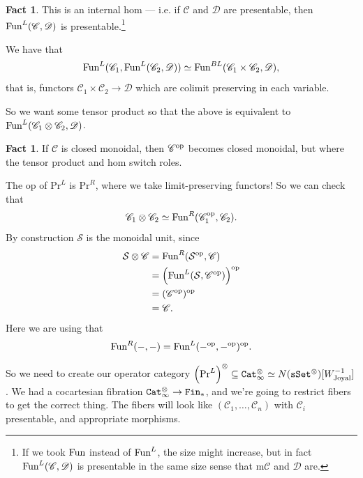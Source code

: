 \documentclass[12pt]{amsart}
\theoremstyle{definition}
\newtheorem{fact}[theorem]{Fact}
\providecommand{\Pr}{\text{Pr}}
\begin{document}
\begin{fact} This is an internal hom --- i.e. if $\mathscr{C}$ and $\mathscr{D}$ are presentable, then $\text{Fun}^L(\mathscr{C},\mathscr{D})$ is presentable.\footnote{If we took $\text{Fun}$ instead of $\text{Fun}^L$, the size might increase, but in fact $\text{Fun}^L(\mathscr{C},\mathscr{D})$ is presentable in the same size sense that m$\mathscr{C}$ and $\mathscr{D}$ are.}
\end{fact}

We have that
\begin{align*}
    \text{Fun}^L(\mathscr{C}_1, \text{Fun}^L(\mathscr{C}_2, \mathscr{D})) \simeq \text{Fun}^{BL}(\mathscr{C}_1 \times \mathscr{C}_2, \mathscr{D}),
\end{align*}
that is, functors $\mathscr{C}_1 \times \mathscr{C}_2 \to \mathscr{D}$ which are colimit preserving in each variable.

So we want some tensor product so that the above is equivalent to $\text{Fun}^L(\mathscr{C}_1 \otimes \mathscr{C}_2, \mathscr{D})$.

\begin{fact} If $\mathscr{C}$ is closed monoidal, then $\mathscr{C}^{\text{op}}$ becomes closed monoidal, but where the tensor product and hom switch roles.
\end{fact}

The op of $\Pr^L$ is $\Pr^R$, where we take limit-preserving functors! So we can check that
\begin{align*}
    \mathscr{C}_1 \otimes \mathscr{C}_2 \simeq \text{Fun}^R(\mathscr{C}_1^{\text{op}},\mathscr{C}_2).
\end{align*}
By construction $\mathcal{S}$ is the monoidal unit, since
\begin{align*}
    \mathcal{S} \otimes \mathscr{C} &= \text{Fun}^R(\mathcal{S}^{\text{op}}, \mathscr{C}) \\
    &= \left( \text{Fun}^L(\mathcal{S}, \mathscr{C}^{\text{op}}) \right)^{\text{op}} \\
    &= (\mathscr{C}^{\text{op}})^{\text{op}} \\
    &= \mathscr{C}.
\end{align*}
Here we are using that
\begin{align*}
    \text{Fun}^R(-,-) = \text{Fun}^L(-^{\text{op}},-^{\text{op}})^{\text{op}}.
\end{align*}

So we need to create our operator category $\left( \Pr^L \right)^\otimes \subseteq \Cat_\infty^\otimes \simeq N(\sSet^\otimes)[W_\text{Joyal}^{-1}]$. We had a cocartesian fibration $\texttt{Cat}_\infty^\otimes \to \texttt{Fin}_\ast$, and we're going to restrict fibers to get the correct thing. The fibers will look like $(\mathscr{C}_1, \ldots, \mathscr{C}_n)$ with $\mathscr{C}_i$ presentable, and appropriate morphisms.
\end{document}
